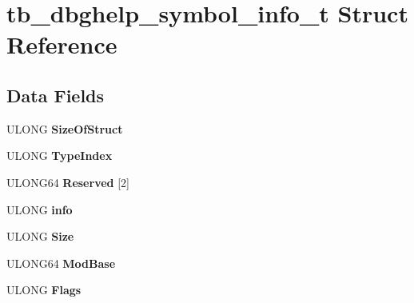 \hypertarget{structtb__dbghelp__symbol__info__t}{\section{tb\-\_\-dbghelp\-\_\-symbol\-\_\-info\-\_\-t Struct Reference}
\label{structtb__dbghelp__symbol__info__t}
}
\subsection*{Data Fields}
\begin{DoxyCompactItemize}
\item 
\hypertarget{structtb__dbghelp__symbol__info__t_af7993bb2b2d3b11d6f0bd686326338a0}{U\-L\-O\-N\-G {\bfseries Size\-Of\-Struct}}\label{structtb__dbghelp__symbol__info__t_af7993bb2b2d3b11d6f0bd686326338a0}

\item 
\hypertarget{structtb__dbghelp__symbol__info__t_a1bcef5d1767793380f116946f46daac6}{U\-L\-O\-N\-G {\bfseries Type\-Index}}\label{structtb__dbghelp__symbol__info__t_a1bcef5d1767793380f116946f46daac6}

\item 
\hypertarget{structtb__dbghelp__symbol__info__t_af34ee10ae8af34e45ca9b0ce468bfa2d}{U\-L\-O\-N\-G64 {\bfseries Reserved} \mbox{[}2\mbox{]}}\label{structtb__dbghelp__symbol__info__t_af34ee10ae8af34e45ca9b0ce468bfa2d}

\item 
\hypertarget{structtb__dbghelp__symbol__info__t_a54a2e303c9797340c557371c0eda86bc}{U\-L\-O\-N\-G {\bfseries info}}\label{structtb__dbghelp__symbol__info__t_a54a2e303c9797340c557371c0eda86bc}

\item 
\hypertarget{structtb__dbghelp__symbol__info__t_ace37af99cfa35ea7d83286b2bb468c6d}{U\-L\-O\-N\-G {\bfseries Size}}\label{structtb__dbghelp__symbol__info__t_ace37af99cfa35ea7d83286b2bb468c6d}

\item 
\hypertarget{structtb__dbghelp__symbol__info__t_ad480a855482ed4d252c8f6ff2dec87e4}{U\-L\-O\-N\-G64 {\bfseries Mod\-Base}}\label{structtb__dbghelp__symbol__info__t_ad480a855482ed4d252c8f6ff2dec87e4}

\item 
\hypertarget{structtb__dbghelp__symbol__info__t_a5f06cf81eb828247d311546913dce5e1}{U\-L\-O\-N\-G {\bfseries Flags}}\label{structtb__dbghelp__symbol__info__t_a5f06cf81eb828247d311546913dce5e1}


\end{DoxyCompactItemize}
